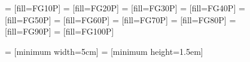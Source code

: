\documentclass{article}
\begin{document}
\begin{figure}[h!]
  \centering




 = [fill=FG10P]
 = [fill=FG20P]
 = [fill=FG30P]
 = [fill=FG40P]
 = [fill=FG50P]
 = [fill=FG60P]
 = [fill=FG70P]
 = [fill=FG80P]
 = [fill=FG90P]
 = [fill=FG100P]

\newcommand\defaultpicheight{2em}
\newcommand\defaultpicheightsmall{1em}
\newcommand\defaultblockheight{1.5em}
\newcommand\defaultblockwidth{5cm}
\newcommand\defaultblockdistance{0.25em}
\newcommand\defaultinterblockdistance{9em}
\newcommand\dibd{\defaultinterblockdistance}
\newcommand\dbh{\defaultblockheight}
\newcommand\blocksizedecrease{0.95}
\newcommand\blocksizeincrease{1.05}

\newcommand*\circled[1]{\tikz[baseline=(char.base)]{
            \node[shape=circle,minimum width = 2em, draw,inner sep=2pt] (char) {#1};}}

 = [minimum width=\defaultblockwidth]
 = [minimum height=\defaultblockheight]



\end{figure}
\end{document}
